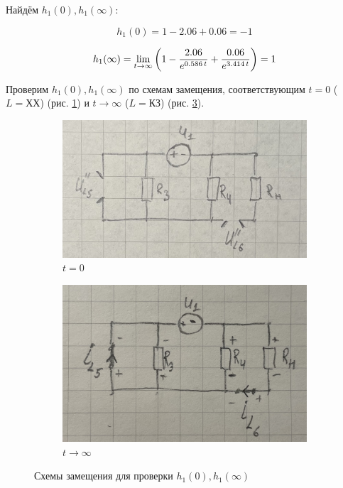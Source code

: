 Найдём $ h_1(0), h_1(\infty) $:

$$ h_1(0) = 1 - 2.06 + 0.06 = -1 $$

$$ h_1(\infty) = 
\mylim[t]{\infty}{
    1
    - \dfrac{2.06}{e^{0.586\,t}}
    + \dfrac{0.06}{e^{3.414\,t}}
} =
1
$$

Проверим
$ h_1(0), h_1(\infty) $ по схемам замещения, 
соответствующим $ t = 0 $ ($ L = ХХ $)
(рис. \ref{fig:t0})
и
$ t \rightarrow \infty $ ($ L = КЗ $)
(рис. \ref{fig:ti}). 

\begin{figure}[H]
    \centering
    \begin{subfigure}[b]{0.45\textwidth}
        \includegraphics[width=\linewidth]{photo/circ_overlay_2}
        \caption{$ t = 0 $}
        \label{fig:t0}
    \end{subfigure}
    \hfill
    \begin{subfigure}[b]{0.45\textwidth}
        \includegraphics[width=\linewidth]{photo/circ_replaced_2}
        \caption{$ t \rightarrow \infty $ }
        \label{fig:ti}
    \end{subfigure}
    \caption{Схемы замещения для проверки $ h_1(0), h_1(\infty) $}
\end{figure}

